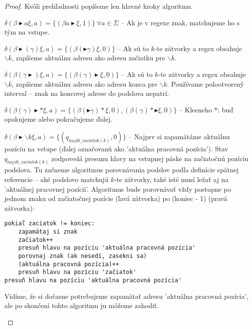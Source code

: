 \begin{proof}
Kvôli prehľadnosti popíšeme len hlavné kroky algoritmu. 
\begin{list}{}{}
\item $\delta(\beta\blacktriangleright a \xi, a) = \lbrace (\beta a \blacktriangleright \xi, 1) \rbrace ~ \forall a \in \Sigma$ -- Ak je v regexe znak, matchujeme ho s tým na vstupe.
\item $\delta(\beta\blacktriangleright(\gamma)\xi, a) = \lbrace (\beta(\blacktriangleright\gamma)\xi, 0) \rbrace$ -- Ak sú to $k$-te zátvorky a regex obsahuje $\backslash k$, zapíšeme aktuálnu adresu ako adresu začiatku pre $\backslash k$.
\item $\delta(\beta(\gamma\blacktriangleright)\xi, a) = \lbrace (\beta(\gamma)\blacktriangleright\xi, 0) \rbrace$ -- Ak sú to $k$-te zátvorky a regex obsahuje $\backslash k$, zapíšeme aktuálnu adresu ako adresu konca pre $\backslash k$. Používame polootvorený interval -- znak na koncovej adrese do podslova nepatrí.
\item $\delta(\beta(\gamma)\blacktriangleright * \xi, a) = \lbrace (\beta(\blacktriangleright\gamma)*\xi, 0),(\beta(\gamma)*\blacktriangleright\xi, 0) \rbrace$ -- Kleeneho $*$: buď opakujeme alebo pokračujeme ďalej.
\item $\delta(\beta\blacktriangleright\backslash k \xi, a) = \lbrace (q_{najdi\_zaciatok(k)}, 0) \rbrace$ -- Najprv si zapamätáme aktuálnu pozíciu na vstupe (ďalej označovanú ako 'aktuálna pracovná pozícia'). Stav $q_{najdi\_zaciatok(k)}$ zodpovedá presunu hlavy na vstupnej páske na začiatočnú pozíciu podslova. Tu začneme algoritmus porovnávania podslov podľa definície spätnej referencie -- aké podslovo matchujú $k$-te zátvorky, také isté musí ležať aj na 'aktuálnej pracovnej pozícii'. Algoritmus bude porovnávať vždy postupne po jednom znaku od začiatočnej pozície (ľavá zátvorka) po (koniec - 1) (pravá zátvorka):

\begin{verbatim}
pokiaľ zaciatok != koniec: 
    zapamätaj si znak 
    začiatok++ 
    presuň hlavu na pozíciu 'aktuálna pracovná pozícia' 
    porovnaj znak (ak nesedí, zasekni sa) 
    (aktuálna pracovná pozícia)++ 
    presuň hlavu na pozíciu 'začiatok' 
presuň hlavu na pozíciu 'aktuálna pracovná pozícia'
\end{verbatim}
Vidíme, že si dočasne potrebujeme zapamätať adresu 'aktuálna pracovná pozícia', ale po skončení tohto algoritmu ju môžeme zahodiť.


\end{list}
\end{proof}
